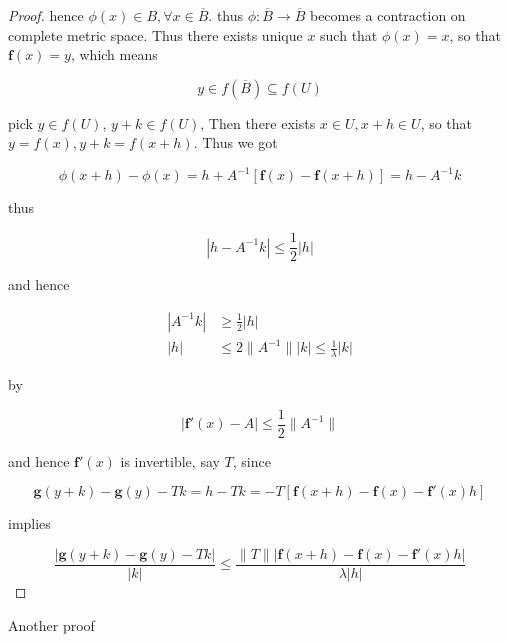 \begin{proof}
   hence $\phi(x) \in B, \forall x \in \overline{B}$. thus $\phi: \overline{B} \to \overline{B}$ becomes a contraction on
   complete metric space. Thus there exists unique $x$ such that $\phi(x) = x$, so that $\mathbf{f}(x) = y$, which means

   \[
    y \in f(\overline{B}) \subseteq f(U)
   \]

   pick $y \in f(U)$, $y + k \in f(U)$, Then there exists $x \in U, x +h \in U$, so that
   $y = f(x), y+k = f(x+h)$. Thus we got

   \[
    \phi(x +h) - \phi(x) = h + A^{-1}\left[ \mathbf{f}(x) - \mathbf{f}(x+h)\right] = h - A^{-1}k
   \]

   thus

   \[
    \left| h - A^{-1}k \right| \le \frac{1}{2} |h |
   \]

   and hence

   \begin{align*}
    \left| A^{-1}k \right| &\ge \frac{1}{2} |h| \\
    |h| & \le 2 \| A^{-1}\| |k| \le \frac{1}{\lambda} |k|
   \end{align*}

   by 
   
   \[
   |\mathbf{f}'(x) - A | \le \frac{1}{2} \| A^{-1}\|
   \]

   and hence $\mathbf{f}'(x)$ is invertible, say $T$, since

   \[
    \mathbf{g}(y+k) - \mathbf{g}(y) - Tk = h - Tk = -T\left[ \mathbf{f}(x+h) - \mathbf{f}(x) - \mathbf{f}'(x)h \right]
   \]

   implies

   \[
    \frac{\left| \mathbf{g}(y+k) - \mathbf{g}(y) - Tk \right|}{|k|} \le \frac{\| T \| \left|\mathbf{f}(x+h) - \mathbf{f}(x) - \mathbf{f}'(x)h \right|}{\lambda |h|}
   \]
\end{proof}

\begin{corollary}
    Another proof
\end{corollary}

